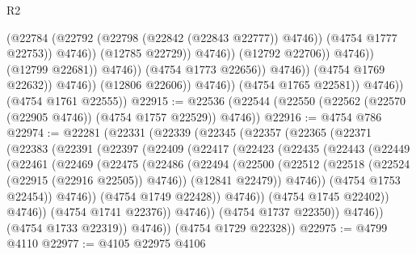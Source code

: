 \begin{lexlean}{R2}
\begin{coremodule}
                                                    (@22784
                                                      (@22792
                                                        (@22798 (@22842 (@22843 @22777)) @4746))
                                                      (@4754 @1777 @22753))
                                                    @4746))
                                                (@12785 @22729))
                                              @4746))
                                          (@12792 @22706))
                                        @4746))
                                    (@12799 @22681))
                                  @4746))
                              (@4754 @1773 @22656))
                            @4746))
                        (@4754 @1769 @22632))
                      @4746))
                  (@12806 @22606))
                @4746))
            (@4754 @1765 @22581))
          @4746))
      (@4754 @1761 @22555))
@22915 := @22536 (@22544 (@22550 (@22562 (@22570 (@22905 @4746)) (@4754 @1757 @22529)) @4746))
@22916 := @4754 @786
@22974 := @22281
    (@22331
      (@22339
        (@22345
          (@22357
            (@22365
              (@22371
                (@22383
                  (@22391
                    (@22397
                      (@22409
                        (@22417
                          (@22423
                            (@22435
                              (@22443
                                (@22449
                                  (@22461
                                    (@22469
                                      (@22475
                                        (@22486
                                          (@22494
                                            (@22500
                                              (@22512
                                                (@22518 (@22524 (@22915 (@22916 @22505)) @4746))
                                                (@12841 @22479))
                                              @4746))
                                          (@4754 @1753 @22454))
                                        @4746))
                                    (@4754 @1749 @22428))
                                  @4746))
                              (@4754 @1745 @22402))
                            @4746))
                        (@4754 @1741 @22376))
                      @4746))
                  (@4754 @1737 @22350))
                @4746))
            (@4754 @1733 @22319))
          @4746))
      (@4754 @1729 @22328))
@22975 := @4799 @4110
@22977 := @4105 @22975 @4106

\end{coremodule}
\end{lexlean}
